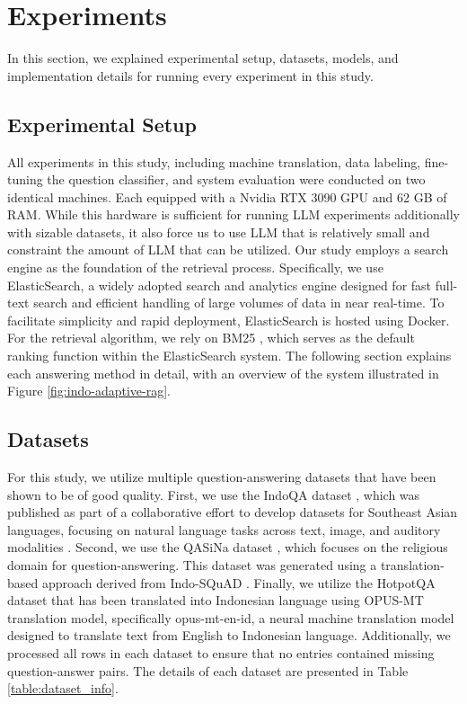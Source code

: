 \documentclass[times]{iapress}
\begin{document}
\section{Experiments}
\label{sec:experiments}
In this section, we explained experimental setup, datasets, models, and implementation details for running every experiment in this study.

\subsection{Experimental Setup}
All experiments in this study, including machine translation, data labeling, fine-tuning the question classifier, and system evaluation were conducted on two identical machines. Each equipped with a Nvidia RTX 3090 GPU and 62 GB of RAM. While this hardware is sufficient for running LLM experiments additionally with sizable datasets, it also force us to use LLM that is relatively small and constraint the amount of LLM that can be utilized. Our study employs a search engine as the foundation of the retrieval process. Specifically, we use ElasticSearch, a widely adopted search and analytics engine designed for fast full-text search and efficient handling of large volumes of data in near real-time. To facilitate simplicity and rapid deployment, ElasticSearch is hosted using Docker. For the retrieval algorithm, we rely on BM25 \cite{bm25}, which serves as the default ranking function within the ElasticSearch system. The following section explains each answering method in detail, with an overview of the system illustrated in Figure \ref{fig:indo-adaptive-rag}.

\subsection{Datasets}
For this study, we utilize multiple question-answering datasets that have been shown to be of good quality. First, we use the IndoQA dataset \cite{indoqa}, which was published as part of a collaborative effort to develop datasets for Southeast Asian languages, focusing on natural language tasks across text, image, and auditory modalities \cite{seacrowd}. Second, we use the QASiNa dataset \cite{qasina}, which focuses on the religious domain for question-answering. This dataset was generated using a translation-based approach derived from Indo-SQuAD \cite{indo-squad}. Finally, we utilize the HotpotQA dataset that has been translated into Indonesian language using OPUS-MT translation model, specifically opus-mt-en-id, a neural machine translation model designed to translate text from English to Indonesian language. Additionally, we processed all rows in each dataset to ensure that no entries contained missing question-answer pairs. The details of each dataset are presented in Table \ref{table:dataset_info}.
\end{document}
